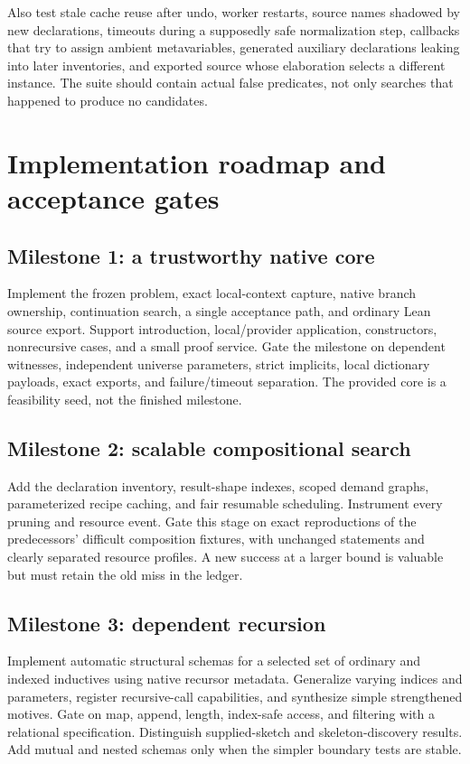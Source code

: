 Also test stale cache reuse after undo, worker restarts, source names shadowed by new declarations, timeouts during a supposedly safe normalization step, callbacks that try to assign ambient metavariables, generated auxiliary declarations leaking into later inventories, and exported source whose elaboration selects a different instance. The suite should contain actual false predicates, not only searches that happened to produce no candidates.

\section{Implementation roadmap and acceptance gates}
\label{sec:roadmap}

\subsection{Milestone 1: a trustworthy native core}

Implement the frozen problem, exact local-context capture, native branch ownership, continuation search, a single acceptance path, and ordinary Lean source export. Support introduction, local/provider application, constructors, nonrecursive cases, and a small proof service. Gate the milestone on dependent witnesses, independent universe parameters, strict implicits, local dictionary payloads, exact exports, and failure/timeout separation. The provided core is a feasibility seed, not the finished milestone.

\subsection{Milestone 2: scalable compositional search}

Add the declaration inventory, result-shape indexes, scoped demand graphs, parameterized recipe caching, and fair resumable scheduling. Instrument every pruning and resource event. Gate this stage on exact reproductions of the predecessors' difficult composition fixtures, with unchanged statements and clearly separated resource profiles. A new success at a larger bound is valuable but must retain the old miss in the ledger.

\subsection{Milestone 3: dependent recursion}

Implement automatic structural schemas for a selected set of ordinary and indexed inductives using native recursor metadata. Generalize varying indices and parameters, register recursive-call capabilities, and synthesize simple strengthened motives. Gate on map, append, length, index-safe access, and filtering with a relational specification. Distinguish supplied-sketch and skeleton-discovery results. Add mutual and nested schemas only when the simpler boundary tests are stable.

